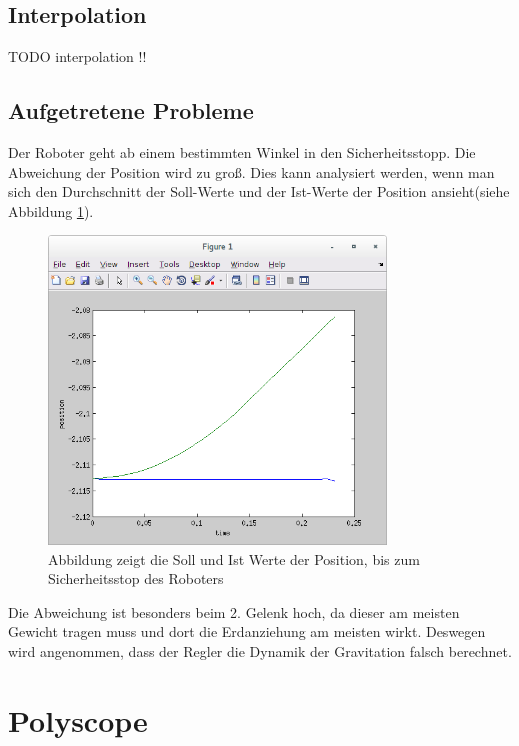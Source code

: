 \subsection{Interpolation}
\label{sub:interpolation_rel}

TODO interpolation !!

\subsection{Aufgetretene Probleme}
\label{sub:capi-problems_rel}

Der Roboter geht ab einem bestimmten Winkel in den Sicherheitsstopp. Die Abweichung der Position wird zu groß. Dies kann analysiert werden, wenn man sich den Durchschnitt der Soll-Werte und der Ist-Werte der Position ansieht(siehe Abbildung \ref{fig:position_join1}).
\\
\begin{figure}[H]
  \centering
    \includegraphics[width=0.8\textwidth]{pic/joint1_position_capi.png}
      \caption[Soll und Ist Werte der Position]{Abbildung zeigt die Soll und Ist Werte der Position, bis zum Sicherheitsstop des Roboters}
      \label{fig:position_join1}
\end{figure}

Die Abweichung ist besonders beim 2. Gelenk hoch, da dieser am meisten Gewicht tragen muss und dort die Erdanziehung am meisten wirkt. Deswegen wird angenommen, dass der Regler die Dynamik der Gravitation falsch berechnet.

\section{Polyscope}
\label{sec:Polyscope_rel}

